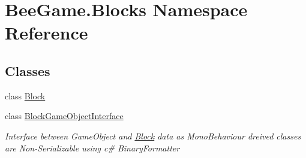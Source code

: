 \hypertarget{namespace_bee_game_1_1_blocks}{}\section{Bee\+Game.\+Blocks Namespace Reference}
\label{namespace_bee_game_1_1_blocks}
\subsection*{Classes}
\begin{DoxyCompactItemize}
\item 
class \hyperlink{class_bee_game_1_1_blocks_1_1_block}{Block}
\item 
class \hyperlink{class_bee_game_1_1_blocks_1_1_block_game_object_interface}{Block\+Game\+Object\+Interface}
\begin{DoxyCompactList}\small\item\em Interface between Game\+Object and \hyperlink{class_bee_game_1_1_blocks_1_1_block}{Block} data as Mono\+Behaviour dreived classes are Non-\/\+Serializable using c\# Binary\+Formatter \end{DoxyCompactList}\end{DoxyCompactItemize}
